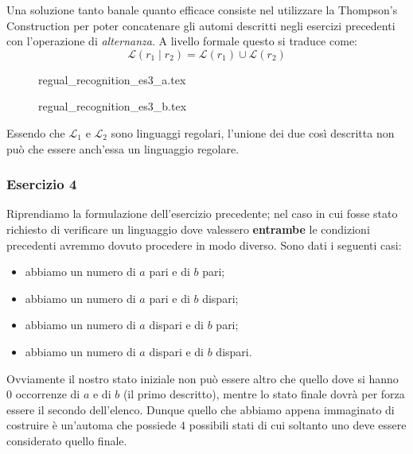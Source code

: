 \documentclass[class=book, crop=false, oneside, 12pt]{standalone}
\begin{document}
Una soluzione tanto banale quanto efficace consiste nel utilizzare la Thompson's Construction per poter concatenare gli automi descritti negli esercizi precedenti con l'operazione di \emph{alternanza}. A livello formale questo si traduce come:
\begin{equation*}
    \mathcal{L}(r_1 \mid r_2) = \mathcal{L}(r_1) \cup \mathcal{L}(r_2)
\end{equation*}
\begin{figure}[H]
    \begin{minipage}[b]{0.4\textwidth}
        \centering
        {regual_recognition_es3_a.tex}
        \label{nfa-b_odd-or-a_even}
    \end{minipage}
    \hfill
    \begin{minipage}[b]{0.4\textwidth}
        \centering
        {regual_recognition_es3_b.tex}
        \label{dfa-b_odd-or-a_even}
    \end{minipage}
    \caption{}
\end{figure}
Essendo che \(\mathcal{L}_1\) e \(\mathcal{L}_2\) sono linguaggi regolari, l'unione dei due così descritta non può che essere anch'essa un linguaggio regolare.

\subsubsection{Esercizio 4}
Riprendiamo la formulazione dell'esercizio precedente; nel caso in cui fosse stato richiesto di verificare un linguaggio dove valessero \textbf{entrambe} le condizioni precedenti avremmo dovuto procedere in modo diverso. Sono dati i seguenti casi:
\begin{itemize}
    \item abbiamo un numero di \(a\) pari e di \(b\) pari;
    \item abbiamo un numero di \(a\) pari e di \(b\) dispari;
    \item abbiamo un numero di \(a\) dispari e di \(b\) pari;
    \item abbiamo un numero di \(a\) dispari e di \(b\) dispari.
\end{itemize}
Ovviamente il nostro stato iniziale non può essere altro che quello dove si hanno \(0\) occorrenze di \(a\) e di \(b\) (il primo descritto), mentre lo stato finale dovrà per forza essere il secondo dell'elenco. Dunque quello che abbiamo appena immaginato di costruire è un'automa che possiede \(4\) possibili stati di cui soltanto uno deve essere considerato quello finale. 
\end{document}
